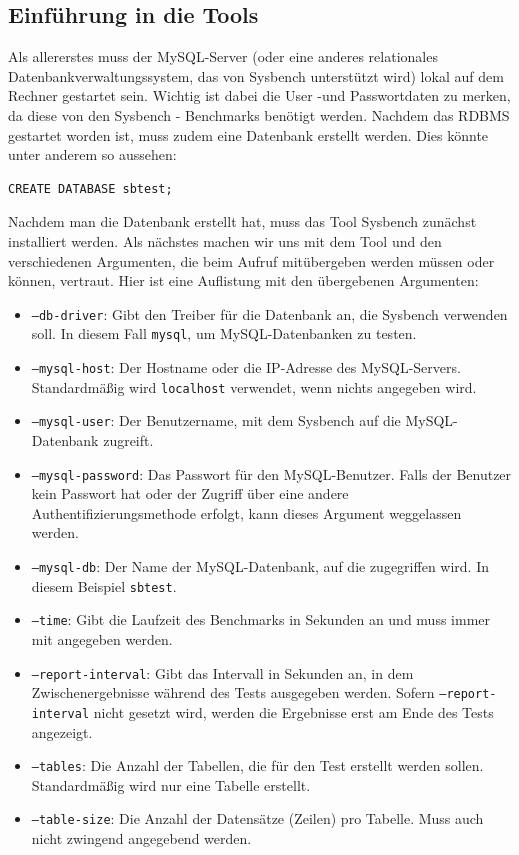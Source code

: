 \subsection{Einführung in die Tools}\label{subsec:einfuhrung-in-die-tools}

Als allererstes muss der MySQL-Server (oder eine anderes relationales Datenbankverwaltungssystem, das von Sysbench
unterstützt wird) lokal auf dem Rechner gestartet sein. Wichtig ist dabei die User -und Passwortdaten zu merken, da
diese von den Sysbench - Benchmarks benötigt werden. Nachdem das RDBMS gestartet worden ist, muss zudem eine
Datenbank erstellt werden. Dies könnte unter anderem so aussehen:

\begin{lstlisting}[label={lst:create database}]
CREATE DATABASE sbtest;
\end{lstlisting}

Nachdem man die Datenbank erstellt hat, muss das Tool Sysbench zunächst installiert werden.
Als nächstes machen wir uns mit dem Tool und den verschiedenen Argumenten,
die beim Aufruf mitübergeben werden müssen oder können, vertraut.
Hier ist eine Auflistung mit den übergebenen Argumenten:

\begin{itemize}
    \item \texttt{--db-driver}: Gibt den Treiber für die Datenbank an, die Sysbench verwenden soll. In diesem Fall \texttt{mysql}, um MySQL-Datenbanken zu testen.
    \item \texttt{--mysql-host}: Der Hostname oder die IP-Adresse des MySQL-Servers. Standardmäßig wird \texttt{localhost} verwendet, wenn nichts angegeben wird.
    \item \texttt{--mysql-user}: Der Benutzername, mit dem Sysbench auf die MySQL-Datenbank zugreift.
    \item \texttt{--mysql-password}: Das Passwort für den MySQL-Benutzer. Falls der Benutzer kein Passwort hat oder der Zugriff über eine andere Authentifizierungsmethode erfolgt, kann dieses Argument weggelassen werden.
    \item \texttt{--mysql-db}: Der Name der MySQL-Datenbank, auf die zugegriffen wird. In diesem Beispiel \texttt{sbtest}.
    \item \texttt{--time}: Gibt die Laufzeit des Benchmarks in Sekunden an und muss immer mit angegeben werden.
    \item \texttt{--report-interval}: Gibt das Intervall in Sekunden an, in dem Zwischenergebnisse während des Tests ausgegeben werden.
    Sofern \texttt{--report-interval} nicht gesetzt wird, werden die Ergebnisse erst am Ende des Tests angezeigt.
    \item \texttt{--tables}: Die Anzahl der Tabellen, die für den Test erstellt werden sollen. Standardmäßig wird nur eine Tabelle erstellt.
    \item \texttt{--table-size}: Die Anzahl der Datensätze (Zeilen) pro Tabelle. Muss auch nicht zwingend angegebend werden.
\end{itemize}


